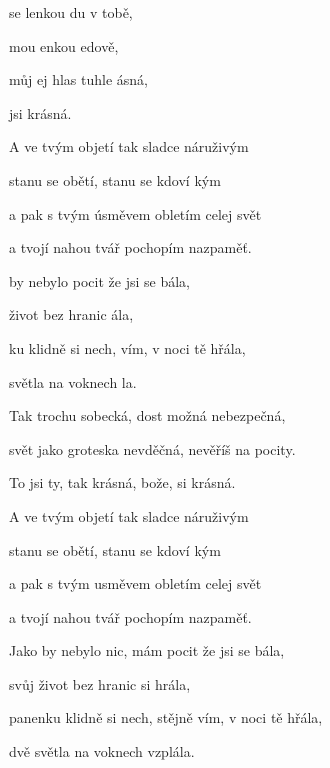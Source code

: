 

\zs
{} se lenkou du v tobě, 

 mou enkou edově, 

 můj ej hlas  tuhle  
ásná,   

 jsi krásná.   
\ks

\zs
A ve tvým objetí tak sladce náruživým

stanu se obětí, stanu se kdoví kým

a pak s tvým úsměvem obletím celej svět

a tvojí nahou tvář pochopím nazpaměť.
\ks

\zr
{} by nebylo   pocit že jsi se bála, 

 život bez hranic ála, 

ku klidně si nech,  vím, v noci tě hřála, 

 světla na voknech  la. 
\kr

\zs
Tak trochu sobecká, dost možná nebezpečná,

svět jako groteska nevděčná, nevěříš na pocity.

To jsi ty, tak krásná, bože, si krásná.



A ve tvým objetí tak sladce náruživým

stanu se obětí, stanu se kdoví kým

a pak s tvým usměvem obletím celej svět

a tvojí nahou tvář pochopím nazpaměť.
\ks


\zr
Jako by nebylo nic, mám pocit že jsi se bála,

svůj život bez hranic si hrála,

panenku klidně si nech, stějně vím, v noci tě hřála,

dvě světla na voknech vzplála.
\kr
\kp





